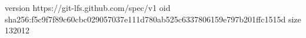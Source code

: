 version https://git-lfs.github.com/spec/v1
oid sha256:f5c9f7f89c60cbc029057037e111d780ab525c6337806159e797b201ffc1515d
size 132012
